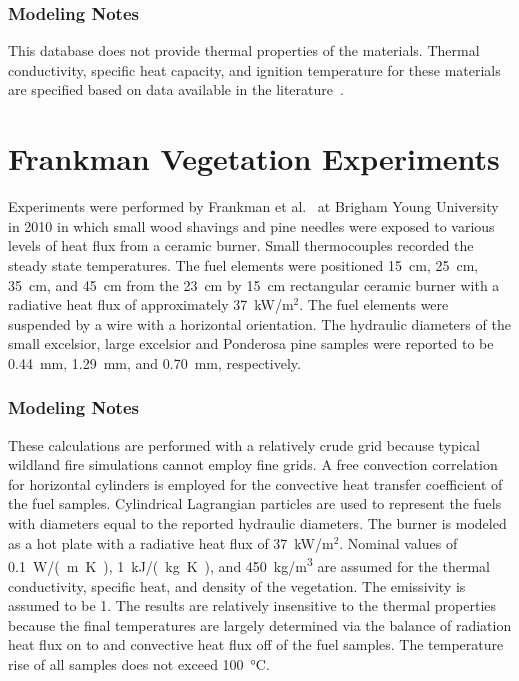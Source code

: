 \subsubsection{Modeling Notes}

This database does not provide thermal properties of the materials. Thermal conductivity, specific heat capacity, and ignition temperature for these materials are specified based on data available in the literature~\cite{SFPE:Tewarson}.

\section{Frankman Vegetation Experiments}
\label{Frankman_Vegetation_Description}

Experiments were performed by Frankman et al.~\cite{Frankman:CST2010} at Brigham Young University in 2010 in which small wood shavings and pine needles were exposed to various levels of heat flux from a ceramic burner. Small thermocouples recorded the steady state temperatures. The fuel elements were positioned 15~cm, 25~cm, 35~cm, and 45~cm from the 23~cm by 15~cm rectangular ceramic burner with a radiative heat flux of approximately 37~kW/m$^2$. The fuel elements were suspended by a wire with a horizontal orientation. The hydraulic diameters of the small excelsior, large excelsior and Ponderosa pine samples were reported to be 0.44~mm, 1.29~mm, and 0.70~mm, respectively.

\subsubsection{Modeling Notes}

These calculations are performed with a relatively crude grid because typical wildland fire simulations cannot employ fine grids. A free convection correlation for horizontal cylinders is employed for the convective heat transfer coefficient of the fuel samples. Cylindrical Lagrangian particles are used to represent the fuels with diameters equal to the reported hydraulic diameters. The burner is modeled as a hot plate with a radiative heat flux of 37~kW/m$^2$. Nominal values of 0.1~\unit{W/(m.K)}, 1~\unit{kJ/(kg.K)}, and 450~\unit{kg/m^3} are assumed for the thermal conductivity, specific heat, and density of the vegetation. The emissivity is assumed to be 1. The results are relatively insensitive to the thermal properties because the final temperatures are largely determined via the balance of radiation heat flux on to and convective heat flux off of the fuel samples. The temperature rise of all samples does not exceed 100~\unit{\degreeCelsius}.


